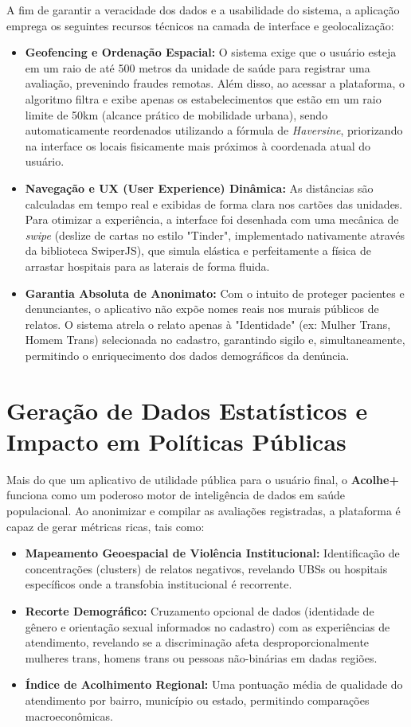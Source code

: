 \documentclass[12pt, a4paper]{article}
\begin{document}
A fim de garantir a veracidade dos dados e a usabilidade do sistema, a aplicação emprega os seguintes recursos técnicos na camada de interface e geolocalização:
\begin{itemize}
    \item \textbf{Geofencing e Ordenação Espacial:} O sistema exige que o usuário esteja em um raio de até 500 metros da unidade de saúde para registrar uma avaliação, prevenindo fraudes remotas. Além disso, ao acessar a plataforma, o algoritmo filtra e exibe apenas os estabelecimentos que estão em um raio limite de 50km (alcance prático de mobilidade urbana), sendo automaticamente reordenados utilizando a fórmula de \textit{Haversine}, priorizando na interface os locais fisicamente mais próximos à coordenada atual do usuário.
    \item \textbf{Navegação e UX (User Experience) Dinâmica:} As distâncias são calculadas em tempo real e exibidas de forma clara nos cartões das unidades. Para otimizar a experiência, a interface foi desenhada com uma mecânica de \textit{swipe} (deslize de cartas no estilo "Tinder", implementado nativamente através da biblioteca SwiperJS), que simula elástica e perfeitamente a física de arrastar hospitais para as laterais de forma fluida.
    \item \textbf{Garantia Absoluta de Anonimato:} Com o intuito de proteger pacientes e denunciantes, o aplicativo não expõe nomes reais nos murais públicos de relatos. O sistema atrela o relato apenas à "Identidade" (ex: Mulher Trans, Homem Trans) selecionada no cadastro, garantindo sigilo e, simultaneamente, permitindo o enriquecimento dos dados demográficos da denúncia.
\end{itemize}

\section{Geração de Dados Estatísticos e Impacto em Políticas Públicas}

Mais do que um aplicativo de utilidade pública para o usuário final, o \textbf{Acolhe+} funciona como um poderoso motor de inteligência de dados em saúde populacional. Ao anonimizar e compilar as avaliações registradas, a plataforma é capaz de gerar métricas ricas, tais como:

\begin{itemize}
    \item \textbf{Mapeamento Geoespacial de Violência Institucional:} Identificação de concentrações (clusters) de relatos negativos, revelando UBSs ou hospitais específicos onde a transfobia institucional é recorrente.
    \item \textbf{Recorte Demográfico:} Cruzamento opcional de dados (identidade de gênero e orientação sexual informados no cadastro) com as experiências de atendimento, revelando se a discriminação afeta desproporcionalmente mulheres trans, homens trans ou pessoas não-binárias em dadas regiões.
    \item \textbf{Índice de Acolhimento Regional:} Uma pontuação média de qualidade do atendimento por bairro, município ou estado, permitindo comparações macroeconômicas.
\end{itemize}
\end{document}
